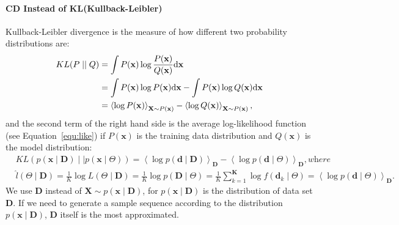 \paragraph{CD Instead of KL(Kullback-Leibler)}
\label{sec:CD}
Kullback-Leibler divergence is the measure of how different two probability distributions are:
\begin{equation}
\begin{aligned}
KL(P \mid \mid Q)
&= \int P(\mathbf{x}) \log \frac{P(\mathbf{x})}{Q(\mathbf{x})} \mathrm{d} \mathbf{x}\\
&= \int P(\mathbf{x}) \log P(\mathbf{x}) \mathrm{d} \mathbf{x} - \int P(\mathbf{x}) \log Q(\mathbf{x}) \mathrm{d} \mathbf{x}\\
&= \left \langle \log P(\mathbf{x}) \right \rangle_{\mathbf{X} \sim P(\mathbf{x})} - \left \langle \log Q(\mathbf{x}) \right \rangle_{\mathbf{X} \sim P(\mathbf{x})} ,
\end{aligned}
\end{equation}
and the second term of the right hand side is the average log-likelihood function (see Equation~\ref{equ:like}) if $P(\mathbf{x})$ is the training data distribution and $Q(\mathbf{x})$ is the model distribution:
\begin{equation}
\begin{aligned}
& KL \left( p(\mathbf{x} \mid \mathbf{D}) \mid \mid p(\mathbf{x} \mid \Theta) \right)
=   \left \langle \log p(\mathbf{d} \mid \mathbf{D}) \right \rangle_{\mathbf{D}} - \left \langle \log p(\mathbf{d} \mid \Theta) \right \rangle_{\mathbf{D}}, \textit{where} \\
& \hat{l} (\Theta \mid \mathbf{D}) =\frac{1}{K}\log  L (\Theta \mid \mathbf{D}) 
=  \frac{1}{K}\log p(\mathbf{D} \mid \Theta ) 
= \frac{1}{K} \sum_{k=1}^{\mathbf{K}} \log f(\mathbf{d}_k \mid \Theta )
= \left \langle \log p(\mathbf{d} \mid \Theta) \right \rangle_{\mathbf{D}}.
\end{aligned}
\end{equation}
We use $ \mathbf{D} $ instead of $ \mathbf{X} \sim p(\mathbf{x} \mid \mathbf{D}) $, for $ p(\mathbf{x} \mid \mathbf{D}) $ is the distribution of data set $ \mathbf{D} $.
If we need to generate a sample sequence according to the distribution $ p(\mathbf{x} \mid \mathbf{D}) $, $ \mathbf{D} $ itself is the most approximated.
